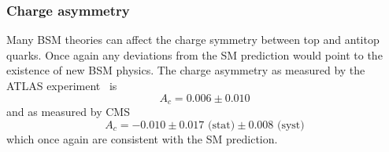 \subsubsection{Charge asymmetry}

Many BSM theories can affect the charge symmetry between top and antitop quarks. Once again any deviations from the SM prediction would point to the existence of new BSM physics. The charge asymmetry as measured by the ATLAS experiment~\cite{TopQuark:ChargeAsymmetryATLAS} is
\begin{equation}
  A_{c}=0.006\pm0.010
\end{equation}
%
and as measured by CMS~\cite{TopQuark:ChargeAsymmetryCMS}
%
\begin{equation}
  A_{c}=-0.010\pm0.017\text{ (stat)}\pm0.008\text{ (syst)}
\end{equation}
%
which once again are consistent with the SM prediction.


